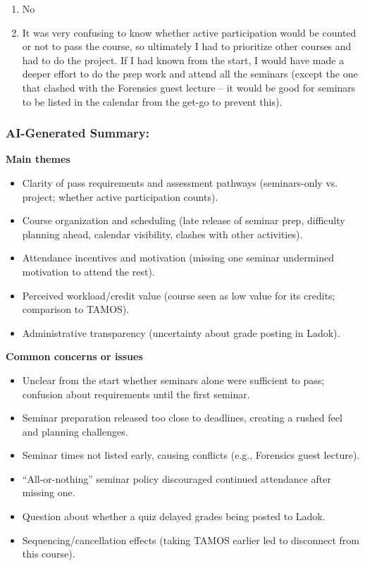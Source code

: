 \documentclass[a4paper]{report}
\begin{document}
\begin{enumerate}
  \item No
  \item It was very confusing to know whether active participation would be counted or not to pass the course, so ultimately I had to prioritize other courses and had to do the project. If I had known from the start, I would have made a deeper effort to do the prep work and attend all the seminars (except the one that clashed with the Forensics guest lecture -- it would be good for seminars to be listed in the calendar from the get-go to prevent this).
\end{enumerate}

\subsubsection{AI-Generated Summary:}

\textbf{Main themes}
\begin{itemize}
\item Clarity of pass requirements and assessment pathways (seminars-only vs. project; whether active participation counts).
\item Course organization and scheduling (late release of seminar prep, difficulty planning ahead, calendar visibility, clashes with other activities).
\item Attendance incentives and motivation (missing one seminar undermined motivation to attend the rest).
\item Perceived workload/credit value (course seen as low value for its credits; comparison to TAMOS).
\item Administrative transparency (uncertainty about grade posting in Ladok).
\end{itemize}

\textbf{Common concerns or issues}
\begin{itemize}
\item Unclear from the start whether seminars alone were sufficient to pass; confusion about requirements until the first seminar.
\item Seminar preparation released too close to deadlines, creating a rushed feel and planning challenges.
\item Seminar times not listed early, causing conflicts (e.g., Forensics guest lecture).
\item “All-or-nothing” seminar policy discouraged continued attendance after missing one.
\item Question about whether a quiz delayed grades being posted to Ladok.
\item Sequencing/cancellation effects (taking TAMOS earlier led to disconnect from this course).
\end{itemize}
\end{document}
